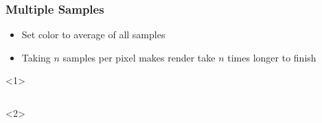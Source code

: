 \documentclass{beamer}
\begin{document}
\begin{frame}[fragile]
	\frametitle{Multiple Samples}
	\begin{itemize}
		\item Set color to average of all samples
		\item Taking $n$ samples per pixel makes render take $n$ times longer to finish
	\end{itemize}
	\begin{onlyenv}
		\inputminted{python}{scripts/samples.py}
	\end{onlyenv}
\end{frame}
\end{document}
